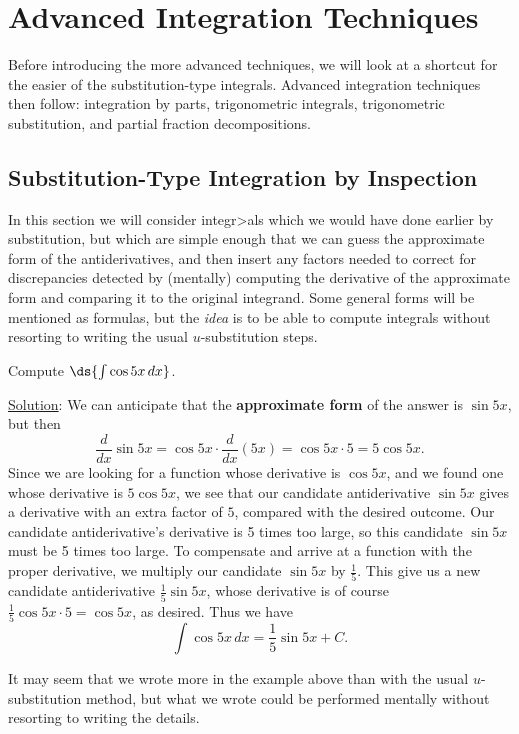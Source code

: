 \chapter{Advanced Integration Techniques\label{AdvancedIntTechniques}}
Before introducing the more advanced techniques, we will look at
a shortcut for the easier of the substitution-type integrals.
Advanced integration techniques then follow:
integration by parts, trigonometric integrals, trigonometric
substitution, and partial fraction decompositions.

\section{Substitution-Type Integration by Inspection}
In this section we will consider integr>als which we 
would have done earlier by substitution, but which are
simple enough that we can guess the approximate form
of the antiderivatives, and then insert any factors needed
to correct for discrepancies detected by (mentally) computing
the derivative of the approximate form and comparing it to 
the original integrand.  Some general forms will be mentioned
as formulas, but the {\it idea} is to be able to compute
integrals without resorting to writing the usual $u$-substitution
steps.

\bex Compute $\ds{\int\cos5x\,dx}$.

\underline{Solution}: We can anticipate that the 
{\bf approximate form\footnotemark} of the answer is
$\sin5x$, 
but then
$$\frac{d}{dx}\sin5x=\cos5x\cdot\frac{d}{dx}(5x)=\cos5x\cdot5=5\cos5x.$$
Since we are looking for a function whose derivative is
$\cos5x$, and we found one whose derivative is $5\cos5x$,
we see that our candidate antiderivative $\sin5x$ gives
a derivative with an extra factor of $5$, compared with
the desired outcome.  Our candidate antiderivative's
derivative is 5 times too large, so
this candidate $\sin 5x$ must be 5 times too large.  To compensate
and arrive at a function with the proper derivative, 
we multiply our candidate  $\sin5x$
by $\frac15$.  This give us a new candidate antiderivative $\frac15\sin5x$,
whose derivative is of course $\frac15\cos5x\cdot5=\cos5x$,
as desired.  Thus we have
$$\int\cos5x\,dx=\frac15\sin5x+C.$$
\eex

It may seem that we wrote more in the example above than with 
the usual $u$-substitution method, but what we
wrote could be performed mentally without resorting to writing
the details.

